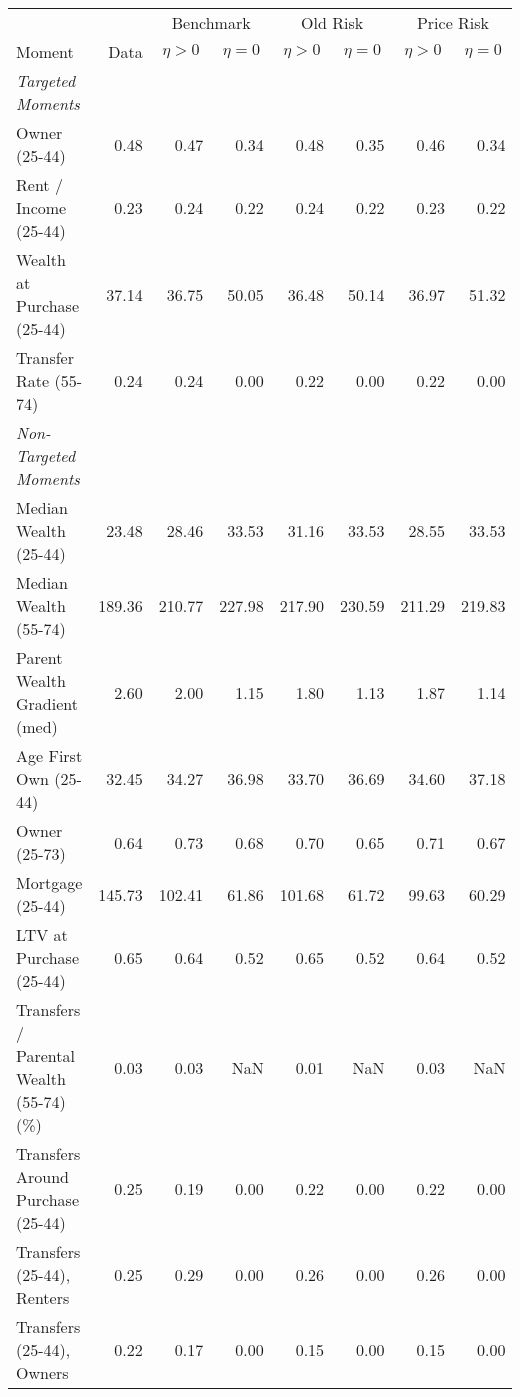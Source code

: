 \begin{tabular}{lr rr rr rr}
 \toprule & & \multicolumn{2}{c}{Benchmark} & \multicolumn{2}{c}{Old Risk} & \multicolumn{2}{c}{Price Risk}
 \\  \cmidrule(lr){3-4}\cmidrule(lr){5-6}\cmidrule(lr){7-8}
Moment & Data & \multicolumn{1}{c}{$ \eta>0 $} & \multicolumn{1}{c}{$ \eta=0 $} & \multicolumn{1}{c}{$ \eta>0 $} & \multicolumn{1}{c}{$ \eta=0 $} & \multicolumn{1}{c}{$ \eta>0 $} & \multicolumn{1}{c}{$ \eta=0 $}\\
\midrule
\textit{Targeted Moments} &  &  &  &  &  &  & \\
\;Owner (25-44) & 0.48 & 0.47 & 0.34 & 0.48 & 0.35 & 0.46 & 0.34\\
\;Rent / Income (25-44) & 0.23 & 0.24 & 0.22 & 0.24 & 0.22 & 0.23 & 0.22\\
\;Wealth at Purchase (25-44) & 37.14 & 36.75 & 50.05 & 36.48 & 50.14 & 36.97 & 51.32\\
\;Transfer Rate (55-74) & 0.24 & 0.24 & 0.00 & 0.22 & 0.00 & 0.22 & 0.00\\
\textit{Non-Targeted Moments} &  &  &  &  &  &  & \\
\;Median Wealth (25-44) & 23.48 & 28.46 & 33.53 & 31.16 & 33.53 & 28.55 & 33.53\\
\;Median Wealth (55-74) & 189.36 & 210.77 & 227.98 & 217.90 & 230.59 & 211.29 & 219.83\\
\;Parent Wealth Gradient (med) & 2.60 & 2.00 & 1.15 & 1.80 & 1.13 & 1.87 & 1.14\\
\;Age First Own (25-44) & 32.45 & 34.27 & 36.98 & 33.70 & 36.69 & 34.60 & 37.18\\
\;Owner (25-73) & 0.64 & 0.73 & 0.68 & 0.70 & 0.65 & 0.71 & 0.67\\
\;Mortgage (25-44) & 145.73 & 102.41 & 61.86 & 101.68 & 61.72 & 99.63 & 60.29\\
\;LTV at Purchase (25-44) & 0.65 & 0.64 & 0.52 & 0.65 & 0.52 & 0.64 & 0.52\\
\;Transfers / Parental Wealth (55-74) (\%) & 0.03 & 0.03 & NaN & 0.01 & NaN & 0.03 & NaN\\
\;Transfers Around Purchase (25-44) & 0.25 & 0.19 & 0.00 & 0.22 & 0.00 & 0.22 & 0.00\\
\;Transfers (25-44), Renters & 0.25 & 0.29 & 0.00 & 0.26 & 0.00 & 0.26 & 0.00\\
\;Transfers (25-44), Owners & 0.22 & 0.17 & 0.00 & 0.15 & 0.00 & 0.15 & 0.00\\
\bottomrule
\end{tabular}
